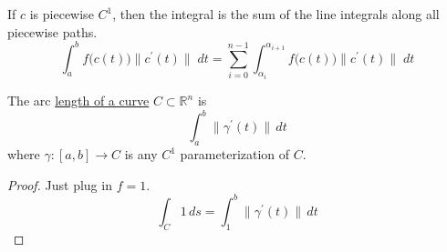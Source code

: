 	If $c$ is piecewise $C^1$, then the integral is the sum of the line integrals along all piecewise paths. 
	\begin{equation}
		\int_a^b f\big(c(t)\big) \|c^\prime (t)\| \;d t = \sum_{i = 0}^{n-1} \int_{\alpha_i}^{\alpha_{i+1}} f\big(c(t)\big) \|c^\prime (t)\| \; d t
	\end{equation}
		
	\begin{lemma}
	  \label{thm:arc-length}
		The arc \hyperref[real-def:length-of-a-curve]{length of a curve} $C \subset \mathbb{R}^n$ is 
		\begin{equation}
			\int_a^b \|\gamma^\prime (t)\| \,dt 
		\end{equation}
		where $\gamma: [a, b] \to C$ is any $C^1$ parameterization of $C$. 
	\end{lemma}
	\begin{proof}
	  Just plug in $f = 1$. 
		\begin{equation}
			\int_C 1 \,ds  = \int_1^b \|\gamma^\prime (t)\| \,dt
		\end{equation}
	\end{proof}
		
	\begin{lemma}
	  \label{thm:line-integral-of-graph}
	
	\end{lemma}
		

